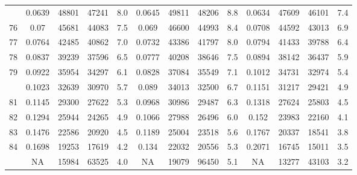 \documentclass[
  14pt,
]{article}
\begin{document}
\begin{longtable}[t]{lcccccccccccc}
\addlinespace
75 & 0.0639 & 48801 & 47241 & 8.0 & 0.0645 & 49811 & 48206 & 8.8 & 0.0634 & 47609 & 46101 & 7.4\\
76 & 0.07 & 45681 & 44083 & 7.5 & 0.069 & 46600 & 44993 & 8.4 & 0.0708 & 44592 & 43013 & 6.9\\
77 & 0.0764 & 42485 & 40862 & 7.0 & 0.0732 & 43386 & 41797 & 8.0 & 0.0794 & 41433 & 39788 & 6.4\\
78 & 0.0837 & 39239 & 37596 & 6.5 & 0.0777 & 40208 & 38646 & 7.5 & 0.0894 & 38142 & 36437 & 5.9\\
79 & 0.0922 & 35954 & 34297 & 6.1 & 0.0828 & 37084 & 35549 & 7.1 & 0.1012 & 34731 & 32974 & 5.4\\
\addlinespace
80 & 0.1023 & 32639 & 30970 & 5.7 & 0.089 & 34013 & 32500 & 6.7 & 0.1151 & 31217 & 29421 & 4.9\\
81 & 0.1145 & 29300 & 27622 & 5.3 & 0.0968 & 30986 & 29487 & 6.3 & 0.1318 & 27624 & 25803 & 4.5\\
82 & 0.1294 & 25944 & 24265 & 4.9 & 0.1066 & 27988 & 26496 & 6.0 & 0.152 & 23983 & 22160 & 4.1\\
83 & 0.1476 & 22586 & 20920 & 4.5 & 0.1189 & 25004 & 23518 & 5.6 & 0.1767 & 20337 & 18541 & 3.8\\
84 & 0.1698 & 19253 & 17619 & 4.2 & 0.134 & 22032 & 20556 & 5.3 & 0.2071 & 16745 & 15011 & 3.5\\
\addlinespace
85 & NA & 15984 & 63525 & 4.0 & NA & 19079 & 96450 & 5.1 & NA & 13277 & 43103 & 3.2\\*
\end{longtable}
\end{document}
